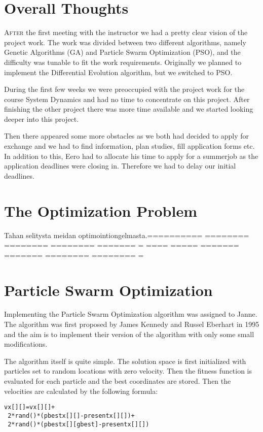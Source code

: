 \documentclass[twoside]{article}
\begin{document}
\begin{multicols}{2} %

\section{Overall Thoughts}

\lettrine[nindent=0em,lines=3]{A}{fter} the first meeting with the instructor we had a pretty clear vision of the project work. The work was divided between two different algorithms, namely Genetic Algorithms (GA) and Particle Swarm Optimization (PSO), and the difficulty was tunable to fit the work requirements. Originally we planned to implement the Differential Evolution algorithm, but we switched to PSO.

During the first few weeks we were preoccupied with the project work for the course System Dynamics and had no time to concentrate on this project. After finishing the other project there was more time available and we started looking deeper into this project.

Then there appeared some more obstacles as we both had decided to apply for exchange and we had to find information, plan studies, fill application forms etc. In addition to this, Eero had to allocate his time to apply for a summerjob as the application deadlines were closing in. Therefore we had to delay our initial deadlines.


\section{The Optimization Problem}
Tahan selitysta meidan optimointiongelmasta.========== ======== ======== ======== ======= =
==== ===== ======= ======= ======== ======== =

\section{Particle Swarm Optimization}

Implementing the Particle Swarm Optimization algorithm was assigned to Janne. The algorithm was first proposed by James Kennedy and Russel Eberhart in 1995 and the aim is to implement their version of the algorithm with only some small modifications.

The algorithm itself is quite simple. The solution space is first initialized with particles set to random locations with zero velocity. Then the fitness function is evaluated for each particle and the best coordinates are stored. Then the velocities are calculated by the following formula: \cite{pso}
\begin{verbatim}
vx[][]=vx[][]+
 2*rand()*(pbestx[][]-presentx[][])+
 2*rand()*(pbestx[][gbest]-presentx[][])
\end{verbatim}


\end{multicols}
\end{document}
